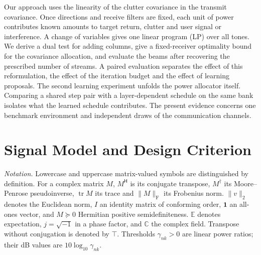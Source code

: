\documentclass[journal]{IEEEtran}
\DeclareMathOperator{\tr}{tr}
\newcommand{\F}{_{\mathrm F}}
\newcommand{\norm}[1]{\lVert #1\rVert}
\begin{document}
Our approach uses the linearity of the clutter covariance in the transmit covariance. Once directions and receive filters are fixed, each unit of power contributes known amounts to target return, clutter and user signal or interference. A change of variables gives one linear program (LP) over all tones. We derive a dual test for adding columns, give a fixed-receiver optimality bound for the covariance allocation, and evaluate the beams after recovering the prescribed number of streams. A paired evaluation separates the effect of this reformulation, the effect of the iteration budget and the effect of learning proposals. The second learning experiment unfolds the power allocator itself. Comparing a shared step pair with a layer-dependent schedule on the same bank isolates what the learned schedule contributes. The present evidence concerns one benchmark environment and independent draws of the communication channels.

\section{Signal Model and Design Criterion}
\emph{Notation.} Lowercase and uppercase matrix-valued symbols are distinguished by definition. For a complex matrix $M$, $M^{\mathsf H}$ is its conjugate transpose, $M^\dagger$ its Moore--Penrose pseudoinverse, $\tr M$ its trace and $\norm M\F$ its Frobenius norm. $\norm v_2$ denotes the Euclidean norm, $I$ an identity matrix of conforming order, $\mathbf1$ an all-ones vector, and $M\succeq0$ Hermitian positive semidefiniteness. $\mathbb E$ denotes expectation, $j=\sqrt{-1}$ in a phase factor, and $\mathbb C$ the complex field. Transpose without conjugation is denoted by $\top$. Thresholds $\gamma_{nk}>0$ are linear power ratios; their dB values are $10\log_{10}\gamma_{nk}$.
\end{document}
